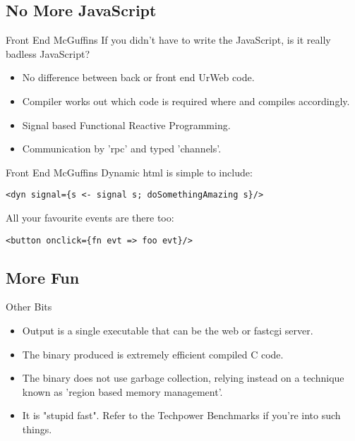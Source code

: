 \documentclass[aspectratio=169]{beamer}
\begin{document}
\subsection{No More JavaScript}
\begin{frame}{Front End McGuffins}
If you didn't have to write the JavaScript, is it really badless JavaScript?\\

\begin{itemize}
\item No difference between back or front end UrWeb code.
\item Compiler works out which code is required where and compiles accordingly.
\item Signal based Functional Reactive Programming.
\item Communication by 'rpc' and typed 'channels'.
\end{itemize}
\end{frame}

\begin{frame}[fragile]{Front End McGuffins}
Dynamic html is simple to include:
\begin{verbatim}
<dyn signal={s <- signal s; doSomethingAmazing s}/>
\end{verbatim}
All your favourite events are there too:
\begin{verbatim}
<button onclick={fn evt => foo evt}/>
\end{verbatim}
\end{frame}

\subsection{More Fun}
\begin{frame}[fragile]{Other Bits}

\begin{itemize}
\item Output is a single executable that can be the web or fastcgi server.
\item The binary produced is extremely efficient compiled C code.
\item The binary does not use garbage collection, relying instead on a technique known as 'region based memory management'.
\item It is "stupid fast". Refer to the Techpower Benchmarks if you're into such things.
\end{itemize}
\end{frame}
\end{document}
